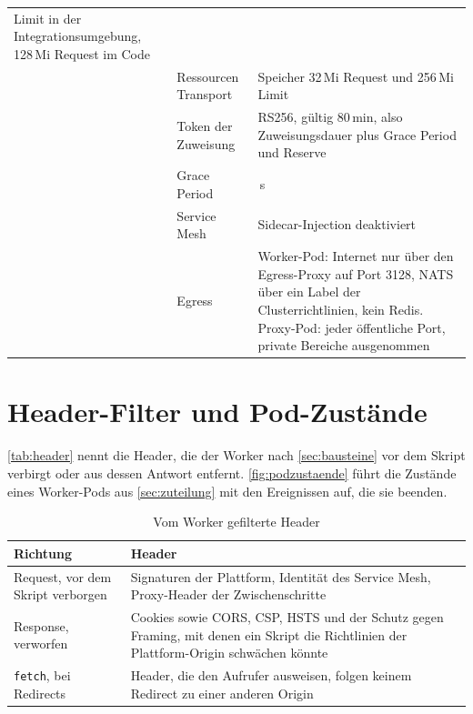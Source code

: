 \begin{table}[H]
\begin{tabularx}{\textwidth}{@{}>{\RaggedRight\arraybackslash}p{}
    >{\RaggedRight\arraybackslash}p{} >{\RaggedRight\arraybackslash}X@{}}
      Limit in der Integrationsumgebung, 128\,Mi Request im Code \\
    & Ressourcen Transport & Speicher 32\,Mi Request und 256\,Mi Limit \\
    & Token der Zuweisung & RS256, gültig 80\,min, also Zuweisungsdauer plus Grace Period und Reserve \\
    & Grace Period & 900\,s \\
    & Service Mesh & Sidecar-Injection deaktiviert \\
    & Egress & Worker-Pod: Internet nur über den Egress-Proxy auf Port 3128, NATS über ein Label der Clusterrichtlinien, kein
      Redis. Proxy-Pod: jeder öffentliche Port, private Bereiche ausgenommen \\
    \hline
  \end{tabularx}
\end{table}

\section{Header-Filter und Pod-Zustände}
\label{anh:header-zustaende}

\autoref{tab:header} nennt die Header, die der Worker nach \autoref{sec:bausteine} vor dem Skript
verbirgt oder aus dessen Antwort entfernt. \autoref{fig:podzustaende} führt die Zustände eines
Worker-Pods aus \autoref{sec:zuteilung} mit den Ereignissen auf, die sie beenden.

\begin{table}[H]
  \caption{Vom Worker gefilterte Header}
  \label{tab:header}
  \small
  \begin{tabularx}{\textwidth}{@{}>{\RaggedRight\arraybackslash}p{}
    >{\RaggedRight\arraybackslash}X@{}}
    \hline
    Richtung & Header \\
    \hline
    Request, vor dem Skript verborgen & Signaturen der Plattform, Identität des Service Mesh,
      Proxy-Header der Zwischenschritte \\[2pt]
    Response, verworfen & Cookies sowie \ac{CORS}, \ac{CSP}, \ac{HSTS} und der Schutz gegen
      Framing, mit denen ein Skript die Richtlinien der Plattform-Origin schwächen könnte \\[2pt]
    \texttt{fetch}, bei Redirects & Header, die den Aufrufer ausweisen, folgen keinem Redirect zu
      einer anderen Origin \\
    \hline
  \end{tabularx}
\end{table}

